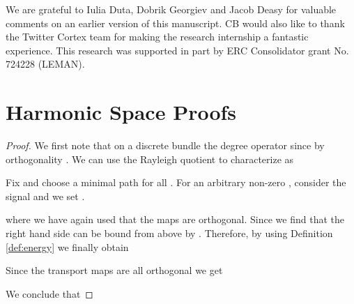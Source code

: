 \documentclass{article}
\begin{document}
\newpage
\begin{ack}

We are grateful to Iulia Duta, Dobrik Georgiev and Jacob Deasy for valuable comments on an earlier version of this manuscript. CB would also like to thank the Twitter Cortex team for making the research internship a fantastic experience. This research was supported in part by ERC Consolidator grant No. 724228 (LEMAN). 

\end{ack}










































\newpage
\appendix

\section{Harmonic Space Proofs}

\UpperBoundEigenv*
\begin{proof}
We first note that on a discrete  bundle the degree operator  since by orthogonality .
We can use the Rayleigh quotient to characterize  as 

\noindent Fix  and choose a minimal path  for all . For an arbitrary non-zero , consider the signal 
and we set .

\noindent where we have again used that the maps are orthogonal. Since  we find that the right hand side can be bound from above by . Therefore, by using Definition \ref{def:energy} we finally obtain

\noindent Since the transport maps are all orthogonal we get

\noindent We conclude that

\end{proof}
\end{document}
